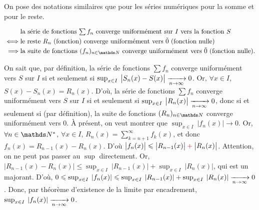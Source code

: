 \begin{rmk}
	On pose des notations similaires que pour les séries numériques pour la somme et pour le reste.
\end{rmk}

\begin{met}
	\begin{align*}
		&\text{la série de fonctions $\ts\sum f_n$\/ converge uniformément sur $I$\/ vers la fonction $S$}\\
		\iff& \text{le reste $R_n$\/ (fonction) converge uniformément vers $\tilde 0$\/ (fonction nulle)}\\
		\implies& \text{la suite de fonctions $(f_n)_{n\in\N}$\/ converge uniformément vers $\tilde 0$\/ (fonction nulle)}.
	\end{align*}
\end{met}

\begin{prv}
	On sait que, par définition, la série de fonctions $\sum f_n$\/ converge uniformément vers $S$\/ sur $I$\/ si et seulement si $\sup_{x \in I}\:\big|S_n(x) - S(x)\big| \xrightarrow[n\to \infty]{} 0$. Or, $\forall x \in I$, $S(x) - S_n(x) = R_n(x)$. D'où, la série de fonctions $\sum f_n$\/ converge uniformément vers $S$\/ sur $I$\/ si et seulement si $\sup_{x \in I}\:\big|R_n(x)\big| \xrightarrow[n\to \infty]{} 0$, donc si et seulement si (par définition), la suite de fonctions $(R_n)_{n\in\N}$\/ converge uniformément vers 0.
	À présent, on veut montrer que $\sup_{x \in I}\:|f_n(x)| \longrightarrow 0$. Or, $\forall n \in \N^*$, $\forall x \in I$, $R_n(x) = \sum_{k=n+1}^{\infty} f_k(x)$, et donc $f_n(x) = R_{n-1}(x) - R_n(x)$. D'où $\big|f_n(x)\big| \leqslant \big|R_{n-1}(x)\big| \mathbin{{\color{red}+}} \big|R_n(x)\big|$. Attention, on ne peut pas passer au $\sup$\/ directement. Or, $\big|R_{n-1}(x) - R_n(x)\big| \le \sup_{x \in I}\:\big|R_{n-1}(x)\big| + \sup_{x \in I}\:\big|R_n(x)\big|$, qui est un majorant.
	D'où, $0 \leqslant \sup_{x\in I}\:|f_n(x)| \leqslant \sup_{x\in I}\:|R_{n-1}(x)| + \sup_{x\in I}\:|R_n(x)|\xrightarrow[n\to \infty]{} 0$. Donc, par théorème d'existence de la limite par encadrement, $\sup_{x \in I}\:|f_n(x)|\xrightarrow[n\to \infty]{} 0$.
\end{prv}

